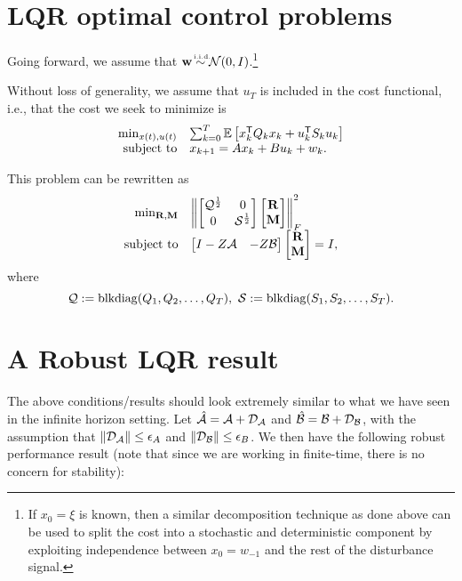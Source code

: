 \documentclass[11pt]{article}
\numberwithin{equation}{section}
\begin{document}
\section{LQR optimal control problems}
Going forward, we assume that $\tf w \iid \mathcal{N}(0,I)$.\footnote{If $x_0 = \xi$ is known, then a similar decomposition technique as done above can be used to split the cost into a stochastic and deterministic component by exploiting independence between $x_0 = w_{-1}$ and the rest of the disturbance signal.} 

Without loss of generality, we assume that $u_{T}$ is included in the cost functional, i.e., that the cost we seek to minimize is
\begin{equation}
\begin{array}{rl}
\min_{x(t),u(t)} & \sum_{k=0}^{T} \mathbb{E}\left[x_k^{\mathsf{T}} Q_k x_k + u_k^{\mathsf{T}} S_ku_k\right] \\
\mbox{subject to} & x_{k+1} = Ax_k + Bu_k + w_k.
\end{array}
\label{eq:lqr_toep}
\end{equation}

This problem can be rewritten as
\begin{equation}
\begin{array}{rl}
\min_{\mathbf{R},\mathbf{M}} & \left\lVert \begin{bmatrix} \mathcal{Q}^{\frac{1}{2}} & 0 \\ 0 & \mathcal{S}^{\frac{1}{2}}\end{bmatrix}\begin{bmatrix}\mathbf{R} \\ \mathbf{M}\end{bmatrix} \right\rVert_F^2 \\
\mbox{subject to} & \begin{bmatrix} I - Z\mathcal{A} & -Z\mathcal{B} \end{bmatrix}\begin{bmatrix} \mathbf{R} \\ \mathbf{M} \end{bmatrix} = I,
\end{array}
\label{eq:lqr_compact}
\end{equation}
where
\begin{equation}
\mathcal{Q} := \mathrm{blkdiag}(Q_1,Q_2, \dots, Q_{T}), \ \mathcal{S} := \mathrm{blkdiag}(S_1,S_2, \dots, S_{T}).
\end{equation}

\section{A Robust LQR result}
The above conditions/results should look extremely similar to what we have seen in the infinite horizon setting.  Let $\hat{\mathcal{A}} = \mathcal{A} + \mathcal{D}_{\mathcal{A}}$ and $\hat{\mathcal{B}} = \mathcal{B} + \mathcal{D}_{\mathcal{B}}$, with the assumption that $\|\mathcal{D}_{\mathcal{A}}\| \leq \epsilon_A$ and $\|\mathcal{D}_{\mathcal{B}}\|\leq \epsilon_B$.  We then have the following robust performance result (note that since we are working in finite-time, there is no concern for stability):
\end{document}
